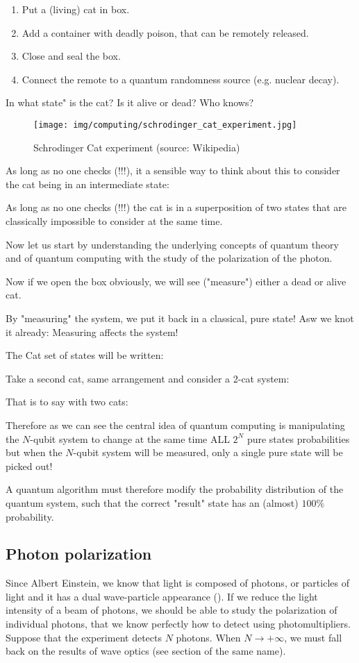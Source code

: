 	\begin{enumerate}
		\item Put a (living) cat in box.
		\item Add a container with deadly poison, that can be remotely released.
		\item Close and seal the box.
		\item Connect the remote to a quantum randomness source (e.g. nuclear decay).
	\end{enumerate}
	In what state" is the cat? Is it alive or dead? Who knows?
	\begin{figure}[H]
		\centering
		\texttt{[image: img/computing/schrodinger\_cat\_experiment.jpg]}
		\caption{Schrodinger Cat experiment (source: Wikipedia)}
	\end{figure}
	As long as no one checks (!!!), it a sensible way to think about this to
consider the cat being in an intermediate state:
	
	As long as no one checks (!!!) the cat is in a superposition of two
states that are classically impossible to consider at the same time.

	Now let us start by understanding the underlying concepts of quantum theory and of quantum computing with the study of the polarization of the photon.
	
	Now if we open the box obviously, we will see ("measure") either a dead or alive cat.
	
	By "measuring" the system, we put it back in a classical, pure state! Asw we knot it already: Measuring affects the system!
	
	The Cat set of states will be written:
	
	Take a second cat, same arrangement and consider a 2-cat system:
	
	That is to say with two cats:
	
	Therefore as we can see the central idea of quantum computing is manipulating the $N$-qubit system to change at the same time ALL $2^N$ pure states probabilities but when the $N$-qubit system will be measured,
only a single pure state will be picked out!

	A quantum algorithm must therefore modify the probability distribution of the quantum system, such that the correct "result" state has an (almost) $100\% $ probability.
	
	\subsection{Photon polarization}
	Since Albert Einstein, we know that light is composed of photons, or particles of light and it has a dual wave-particle appearance (). If we reduce the light intensity of a beam of photons, we should be able to study the polarization of individual photons, that we know perfectly how to detect using photomultipliers. Suppose that the experiment detects $N$ photons. When $N\rightarrow +\infty$, we must fall back on the results of wave optics (see section of the same name).
	
